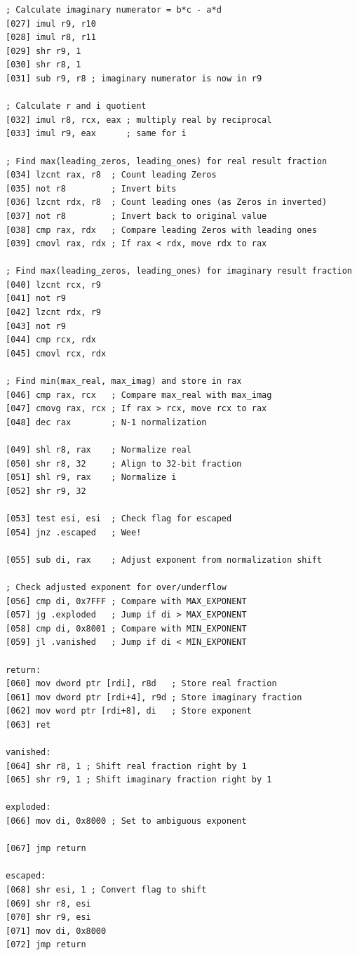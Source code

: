\documentclass[12pt,letter]{article}
\begin{document}
\begin{lstlisting}[style=rust, caption={Complete Complex Division Assembly Implementation}, label={fig:circle_divide}]
; Calculate imaginary numerator = b*c - a*d
[027] imul r9, r10
[028] imul r8, r11
[029] shr r9, 1
[030] shr r8, 1
[031] sub r9, r8 ; imaginary numerator is now in r9

; Calculate r and i quotient
[032] imul r8, rcx, eax ; multiply real by reciprocal
[033] imul r9, eax      ; same for i

; Find max(leading_zeros, leading_ones) for real result fraction
[034] lzcnt rax, r8  ; Count leading Zeros
[035] not r8         ; Invert bits
[036] lzcnt rdx, r8  ; Count leading ones (as Zeros in inverted)
[037] not r8         ; Invert back to original value
[038] cmp rax, rdx   ; Compare leading Zeros with leading ones
[039] cmovl rax, rdx ; If rax < rdx, move rdx to rax

; Find max(leading_zeros, leading_ones) for imaginary result fraction
[040] lzcnt rcx, r9
[041] not r9
[042] lzcnt rdx, r9
[043] not r9
[044] cmp rcx, rdx
[045] cmovl rcx, rdx

; Find min(max_real, max_imag) and store in rax
[046] cmp rax, rcx   ; Compare max_real with max_imag
[047] cmovg rax, rcx ; If rax > rcx, move rcx to rax
[048] dec rax        ; N-1 normalization

[049] shl r8, rax    ; Normalize real
[050] shr r8, 32     ; Align to 32-bit fraction
[051] shl r9, rax    ; Normalize i
[052] shr r9, 32

[053] test esi, esi  ; Check flag for escaped
[054] jnz .escaped   ; Wee!

[055] sub di, rax    ; Adjust exponent from normalization shift

; Check adjusted exponent for over/underflow
[056] cmp di, 0x7FFF ; Compare with MAX_EXPONENT
[057] jg .exploded   ; Jump if di > MAX_EXPONENT
[058] cmp di, 0x8001 ; Compare with MIN_EXPONENT
[059] jl .vanished   ; Jump if di < MIN_EXPONENT

return:
[060] mov dword ptr [rdi], r8d   ; Store real fraction
[061] mov dword ptr [rdi+4], r9d ; Store imaginary fraction
[062] mov word ptr [rdi+8], di   ; Store exponent
[063] ret

vanished:
[064] shr r8, 1 ; Shift real fraction right by 1
[065] shr r9, 1 ; Shift imaginary fraction right by 1

exploded:
[066] mov di, 0x8000 ; Set to ambiguous exponent

[067] jmp return

escaped:
[068] shr esi, 1 ; Convert flag to shift
[069] shr r8, esi                      
[070] shr r9, esi
[071] mov di, 0x8000
[072] jmp return


\end{lstlisting}
\end{document}
